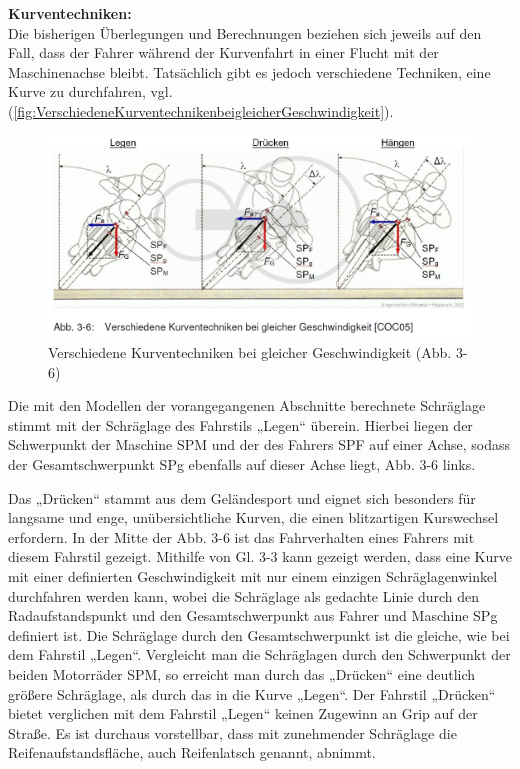\textbf{Kurventechniken:}\\
Die bisherigen Überlegungen und Berechnungen beziehen sich jeweils auf den Fall, dass der Fahrer während der Kurvenfahrt in einer Flucht mit der Maschinenachse bleibt. Tatsächlich gibt es jedoch verschiedene Techniken, eine Kurve zu durchfahren, vgl. (\autoref{fig:VerschiedeneKurventechnikenbeigleicherGeschwindigkeit}).
\begin{figure}[H]
	\centering
	\includegraphics[width=\linewidth]{Bilder/VerschiedeneKurventechnikenbeigleicherGeschwindigkeit.png}
	\caption{Verschiedene Kurventechniken bei gleicher Geschwindigkeit (Abb. 3-6)}
	\label{fig:VerschiedeneKurventechnikenbeigleicherGeschwindigkeit}
\end{figure}

Die mit den Modellen der vorangegangenen Abschnitte berechnete Schräglage stimmt mit der Schräglage des Fahrstils „Legen“ überein. Hierbei liegen der Schwerpunkt der Maschine SPM und der des Fahrers SPF auf einer Achse, sodass der Gesamtschwerpunkt SPg ebenfalls auf dieser Achse liegt, Abb. 3-6 links. 

Das „Drücken“ stammt aus dem Geländesport und eignet sich besonders für langsame und enge, unübersichtliche Kurven, die einen blitzartigen Kurswechsel erfordern. In der Mitte der Abb. 3-6 ist das Fahrverhalten eines Fahrers mit diesem Fahrstil gezeigt. Mithilfe von Gl. 3-3 kann gezeigt werden, dass eine Kurve mit einer definierten Geschwindigkeit mit nur einem einzigen Schräglagenwinkel durchfahren werden kann, wobei die Schräglage als gedachte Linie durch den Radaufstandspunkt und den Gesamtschwerpunkt aus Fahrer und Maschine SPg definiert ist. Die Schräglage durch den Gesamtschwerpunkt ist die gleiche, wie bei dem Fahrstil „Legen“. Vergleicht man die Schräglagen durch den Schwerpunkt der beiden Motorräder SPM, so erreicht man durch das „Drücken“ eine deutlich größere Schräglage, als durch das in die Kurve „Legen“. Der Fahrstil „Drücken“ bietet verglichen mit dem Fahrstil „Legen“ keinen Zugewinn an Grip auf der Straße. Es ist durchaus vorstellbar, dass mit zunehmender Schräglage die Reifenaufstandsfläche, auch Reifenlatsch genannt, abnimmt.

